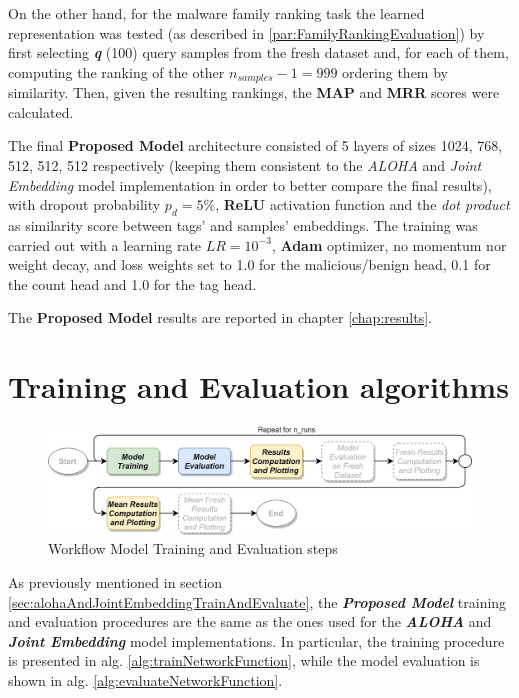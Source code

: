 \documentclass[pdfa%
,cucitura%
]{toptesi}
\begin{document}
On the other hand, for the malware family ranking task the learned representation was tested (as described in \ref{par:FamilyRankingEvaluation}) by first selecting \textit{\textbf{q}} (100) query samples from the fresh dataset and, for each of them, computing the ranking of the other $n_{samples} - 1 = 999$ ordering them by similarity. Then, given the resulting rankings, the \textbf{MAP} and \textbf{MRR} scores were calculated.

The final \textbf{Proposed Model} architecture consisted of 5 layers of sizes 1024, 768, 512, 512, 512 respectively (keeping them consistent to the \textit{ALOHA} and \textit{Joint Embedding} model implementation in order to better compare the final results), with dropout probability $p_d=5\%$, \textbf{ReLU} activation function and the \textit{dot product} as similarity score between tags' and samples' embeddings. The training was carried out with a learning rate $LR=10^{-3}$, \textbf{Adam} optimizer, no momentum nor weight decay, and loss weights set to 1.0 for the malicious/benign head, 0.1 for the count head and 1.0 for the tag head.

The \textbf{Proposed Model} results are reported in chapter \ref{chap:results}.

\section{Training and Evaluation algorithms}
\begin{figure}[h!]
	\centering
	\includegraphics[width=\textwidth]{./images/workflow_sorel.png}
	\caption[Training and evaluation workflow steps]{Workflow Model Training and Evaluation steps}
	\label{fig:workflow_train_eval_plot2}
\end{figure}

As previously mentioned in section \ref{sec:alohaAndJointEmbeddingTrainAndEvaluate}, the \textbf{\textit{Proposed Model}} training and evaluation procedures are the same as the ones used for the \textbf{\textit{ALOHA}} and \textbf{\textit{Joint Embedding}} model implementations. In particular, the training procedure is presented in alg. \ref{alg:trainNetworkFunction}, while the model evaluation is shown in alg. \ref{alg:evaluateNetworkFunction}.
\end{document}
